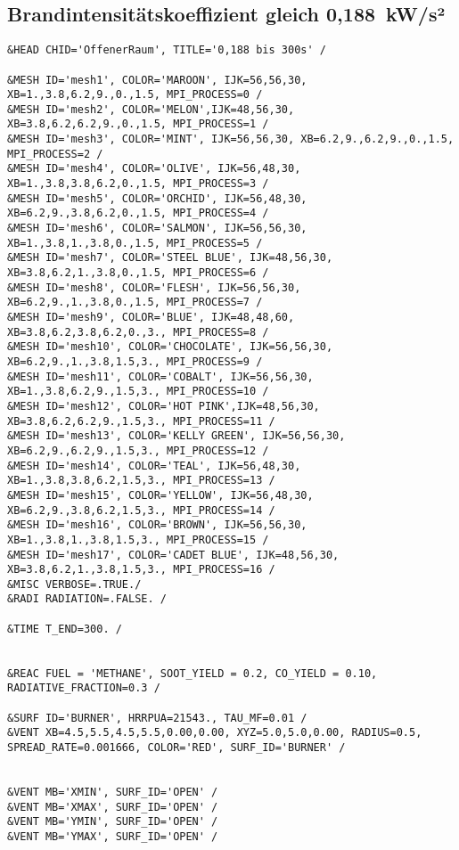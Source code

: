 \subsection*{Brandintensitätskoeffizient gleich 0,188~kW/s²}
\begin{lstlisting}[emptylines=0,basicstyle=\tiny]
&HEAD CHID='OffenerRaum', TITLE='0,188 bis 300s' /

&MESH ID='mesh1', COLOR='MAROON', IJK=56,56,30, XB=1.,3.8,6.2,9.,0.,1.5, MPI_PROCESS=0 /
&MESH ID='mesh2', COLOR='MELON',IJK=48,56,30, XB=3.8,6.2,6.2,9.,0.,1.5, MPI_PROCESS=1 /
&MESH ID='mesh3', COLOR='MINT', IJK=56,56,30, XB=6.2,9.,6.2,9.,0.,1.5, MPI_PROCESS=2 /
&MESH ID='mesh4', COLOR='OLIVE', IJK=56,48,30, XB=1.,3.8,3.8,6.2,0.,1.5, MPI_PROCESS=3 /
&MESH ID='mesh5', COLOR='ORCHID', IJK=56,48,30, XB=6.2,9.,3.8,6.2,0.,1.5, MPI_PROCESS=4 /
&MESH ID='mesh6', COLOR='SALMON', IJK=56,56,30, XB=1.,3.8,1.,3.8,0.,1.5, MPI_PROCESS=5 /
&MESH ID='mesh7', COLOR='STEEL BLUE', IJK=48,56,30, XB=3.8,6.2,1.,3.8,0.,1.5, MPI_PROCESS=6 /
&MESH ID='mesh8', COLOR='FLESH', IJK=56,56,30, XB=6.2,9.,1.,3.8,0.,1.5, MPI_PROCESS=7 /
&MESH ID='mesh9', COLOR='BLUE', IJK=48,48,60, XB=3.8,6.2,3.8,6.2,0.,3., MPI_PROCESS=8 /
&MESH ID='mesh10', COLOR='CHOCOLATE', IJK=56,56,30, XB=6.2,9.,1.,3.8,1.5,3., MPI_PROCESS=9 /
&MESH ID='mesh11', COLOR='COBALT', IJK=56,56,30, XB=1.,3.8,6.2,9.,1.5,3., MPI_PROCESS=10 /
&MESH ID='mesh12', COLOR='HOT PINK',IJK=48,56,30, XB=3.8,6.2,6.2,9.,1.5,3., MPI_PROCESS=11 /
&MESH ID='mesh13', COLOR='KELLY GREEN', IJK=56,56,30, XB=6.2,9.,6.2,9.,1.5,3., MPI_PROCESS=12 /
&MESH ID='mesh14', COLOR='TEAL', IJK=56,48,30, XB=1.,3.8,3.8,6.2,1.5,3., MPI_PROCESS=13 /
&MESH ID='mesh15', COLOR='YELLOW', IJK=56,48,30, XB=6.2,9.,3.8,6.2,1.5,3., MPI_PROCESS=14 /
&MESH ID='mesh16', COLOR='BROWN', IJK=56,56,30, XB=1.,3.8,1.,3.8,1.5,3., MPI_PROCESS=15 /
&MESH ID='mesh17', COLOR='CADET BLUE', IJK=48,56,30, XB=3.8,6.2,1.,3.8,1.5,3., MPI_PROCESS=16 /
&MISC VERBOSE=.TRUE./
&RADI RADIATION=.FALSE. /

&TIME T_END=300. /


&REAC FUEL = 'METHANE', SOOT_YIELD = 0.2, CO_YIELD = 0.10, RADIATIVE_FRACTION=0.3 /

&SURF ID='BURNER', HRRPUA=21543., TAU_MF=0.01 /
&VENT XB=4.5,5.5,4.5,5.5,0.00,0.00, XYZ=5.0,5.0,0.00, RADIUS=0.5, SPREAD_RATE=0.001666, COLOR='RED', SURF_ID='BURNER' /


&VENT MB='XMIN', SURF_ID='OPEN' /  
&VENT MB='XMAX', SURF_ID='OPEN' /  
&VENT MB='YMIN', SURF_ID='OPEN' /  
&VENT MB='YMAX', SURF_ID='OPEN' / 
 

\end{lstlisting}
